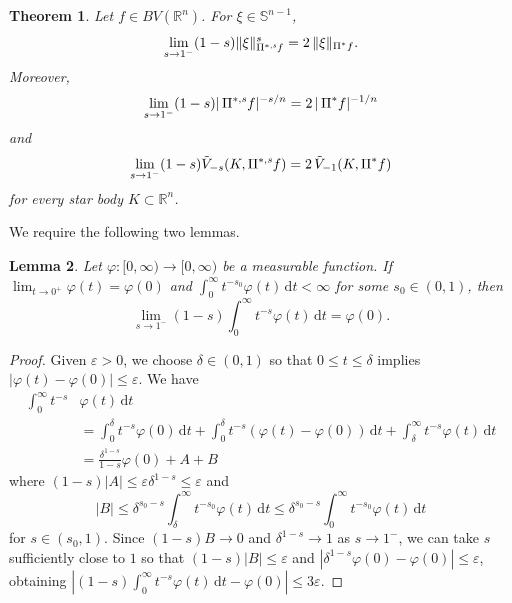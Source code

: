 \documentclass{amsart}
\newtheorem{theorem}{Theorem}
\newtheorem{lemma}[theorem]{Lemma}
\newcommand{\opp}{\operatorname{\Pi}^*\!}
\newcommand{\ofpp}[1]{\operatorname{\Pi^{\ast,{\it #1}}}\!}
\newcommand{\snvtex}{{\mathbb S}^{n-1}}
\newcommand{\dvtex}{\,\mathrm{d}}
\newcommand{\vol}[1]{ \vert #1\vert}
\begin{document}
\begin{theorem}
\label{thm_limitM}
Let $f \in BV (\mathbb R^{n})$. For $\xi \in \snvtex $,
%
\begin{equation*}
\lim _{s\to 1^{-}} (1-s)\Vert \xi \Vert _{\ofpp{s} f}^{s} = 2\,
\Vert \xi \Vert _{\opp f}.
\end{equation*}
%
Moreover,
%
\begin{equation*}
\lim _{s\to 1^{-}} (1-s) \vol{\ofpp{s} f}^{-s/n} = 2\, \vol{\opp f}^{-1/n}
\end{equation*}
%
and
%
\begin{equation}
\lim _{s\to 1^{-}} (1-s) \tilde V_{-s}(K, \ofpp{s} f)= 2\,\tilde V_{-1}(K,
\opp f)
\nonumber \end{equation}
%
for every star body $K\subset \mathbb R^{n}$.
\end{theorem}

\goodbreak
We require the following two lemmas.

\begin{lemma}
\label{lem_limit1D}
Let $\varphi \colon [0,\infty ) \to [0,\infty )$ be a measurable function.
If $\lim _{t\to 0^{+}} \varphi (t) = \varphi (0)$ and
$\int _{0}^{\infty }t^{-s_{0}} \varphi (t) \dvtex t < \infty $ for some
$s_{0} \in (0,1)$, then
%
\begin{equation*}
\lim _{s\to 1^{-}} (1-s) \int _{0}^{\infty }t^{-s} \varphi (t) \dvtex t =
\varphi (0).
\end{equation*}
%
\end{lemma}
%
\begin{proof}
Given $\varepsilon > 0$, we choose $\delta \in (0,1)$ so that
$0 \leq t \leq \delta $ implies
$|\varphi (t) - \varphi (0)| \leq \varepsilon $. We have
%
\begin{align}
\int _{0}^{\infty }t^{-s} &\varphi (t) \dvtex t
\nonumber \\
&= \int _{0}^{\delta }t^{-s} \varphi (0) \dvtex t + \int _{0}^{\delta }t^{-s}
(\varphi (t)-\varphi (0)) \dvtex t + \int _{\delta}^{\infty }t^{-s}
\varphi (t) \dvtex t
\nonumber \\
&= \frac{\delta ^{1-s}}{1-s} \varphi (0) + A + B
\nonumber \end{align}
%
where $(1-s)|A| \leq \varepsilon \delta ^{1-s} \leq \varepsilon $ and
%
\begin{equation*}
|B| \leq \delta ^{s_{0}-s} \int _{\delta}^{\infty }t^{-s_{0}}
\varphi (t) \dvtex t \leq \delta ^{s_{0}-s} \int _{0}^{\infty }t^{-s_{0}}
\varphi (t) \dvtex t
\end{equation*}
%
for $s \in (s_{0}, 1)$. Since $(1-s)B \to 0$ and
$\delta ^{1-s} \to 1$ as $s \to 1^{-}$, we can take $s$ sufficiently close
to $1$ so that $(1-s)|B| \leq \varepsilon $ and
$|\delta ^{1-s} \varphi (0) - \varphi (0)| \leq \varepsilon $, obtaining
$\left | (1-s) \int _{0}^{\infty }t^{-s} \varphi (t) \dvtex t - \varphi (0)
\right | \leq 3 \varepsilon $.
\end{proof}
\end{document}
